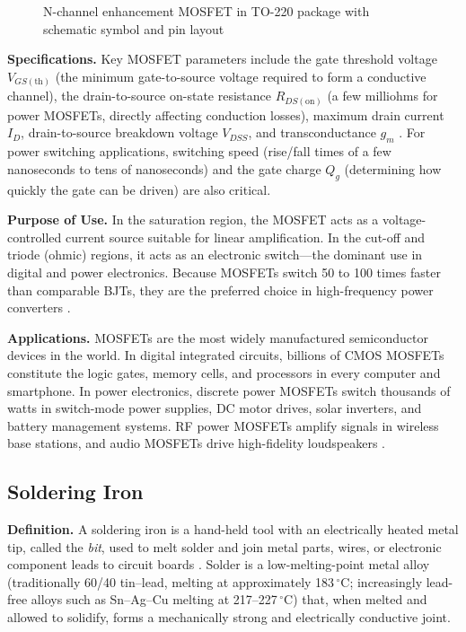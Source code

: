 \documentclass[12pt, a4paper, twoside]{report}
\newcommand{\imgplaceholder}[2]{%
  \begin{figure}[H]
    \centering
    \fcolorbox{gray!60}{gray!12}{%
      \parbox[c][5cm][c]{0.65\textwidth}{%
        \centering
        \textcolor{gray!80}{\Large [Image Placeholder]}\\[6pt]
        \textcolor{gray}{\small Insert figure here}
      }%
    }
    \caption{#1}
    \label{fig:#2}
  \end{figure}
}
\begin{document}
\imgplaceholder{N-channel enhancement MOSFET in TO-220 package with schematic symbol and pin layout}{mosfet}

\textbf{Specifications.}\quad
Key MOSFET parameters include the gate threshold voltage $V_{GS(\text{th})}$ (the
minimum gate-to-source voltage required to form a conductive channel), the drain-to-source
on-state resistance $R_{DS(\text{on})}$ (a few milliohms for power MOSFETs, directly
affecting conduction losses), maximum drain current $I_D$, drain-to-source breakdown
voltage $V_{DSS}$, and transconductance $g_m$ \cite{razavi2013}. For power switching
applications, switching speed (rise/fall times of a few nanoseconds to tens of
nanoseconds) and the gate charge $Q_g$ (determining how quickly the gate can be driven)
are also critical.

\textbf{Purpose of Use.}\quad
In the saturation region, the MOSFET acts as a voltage-controlled current source
suitable for linear amplification. In the cut-off and triode (ohmic) regions, it acts
as an electronic switch---the dominant use in digital and power electronics. Because
MOSFETs switch 50 to 100 times faster than comparable BJTs, they are the preferred
choice in high-frequency power converters \cite{wiki:mosfet}.

\textbf{Applications.}\quad
MOSFETs are the most widely manufactured semiconductor devices in the world. In digital
integrated circuits, billions of CMOS MOSFETs constitute the logic gates, memory cells,
and processors in every computer and smartphone. In power electronics, discrete power
MOSFETs switch thousands of watts in switch-mode power supplies, DC motor drives, solar
inverters, and battery management systems. RF power MOSFETs amplify signals in wireless
base stations, and audio MOSFETs drive high-fidelity loudspeakers \cite{wiki:mosfet}.

\subsection{Soldering Iron}

\textbf{Definition.}\quad
A soldering iron is a hand-held tool with an electrically heated metal tip, called the
\textit{bit}, used to melt solder and join metal parts, wires, or electronic component
leads to circuit boards \cite{wiki:solderiron}. Solder is a low-melting-point metal
alloy (traditionally 60/40 tin--lead, melting at approximately 183\,$^\circ$C; increasingly
lead-free alloys such as Sn--Ag--Cu melting at 217--227\,$^\circ$C) that, when
melted and allowed to solidify, forms a mechanically strong and electrically conductive
joint.
\end{document}
